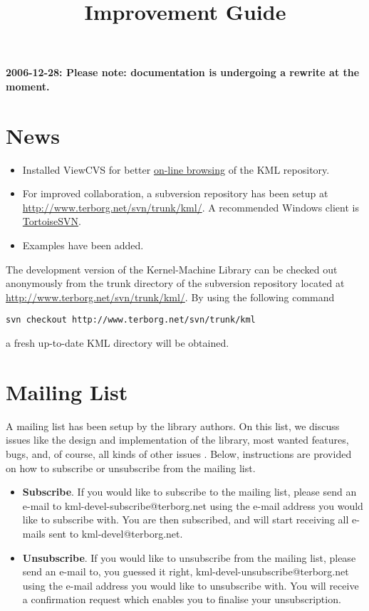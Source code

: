 \documentclass{article}
\begin{document}
\title{Improvement Guide}
\maketitle

\textbf{2006-12-28: Please note: documentation is undergoing a rewrite at the moment.}

\section*{News}

\begin{itemize}

\item Installed ViewCVS for better 
\href{http://www.terborg.net/cgi-bin/viewcvs.cgi/trunk/kml/}{on-line browsing}
of the KML repository.
\item For improved collaboration, a subversion repository has been 
setup at \href{http://www.terborg.net/svn/trunk/kml/}{http://www.terborg.net/svn/trunk/kml/}. A
recommended Windows client is \href{http://tortoisesvn.tigris.org/}{TortoiseSVN}.
\item Examples have been added.

\end{itemize}


The development version of the Kernel-Machine Library can be checked out anonymously from 
the trunk directory of the subversion repository located at 
\href{http://www.terborg.net/svn/trunk/kml/}{http://www.terborg.net/svn/trunk/kml/}. By using the following command
\begin{verbatim}
svn checkout http://www.terborg.net/svn/trunk/kml
\end{verbatim}
a fresh up-to-date KML directory will be obtained. 

\section*{Mailing List}
A mailing list has been setup by the library authors. 
On this list, we discuss issues like the design and implementation of the library, 
most wanted features, bugs,
and, of course, all kinds of other issues \smile.
Below, instructions are provided on how to subscribe or unsubscribe from the mailing list.

\begin{itemize}
\item \textbf{Subscribe}. If you would like to subscribe to the mailing list, please send an
e-mail to kml-devel-subscribe@terborg.net using the e-mail address you would like to subscribe
with. You are then subscribed, and will start receiving all e-mails sent to kml-devel@terborg.net.
\item \textbf{Unsubscribe}. If you would like to unsubscribe from the mailing list,
please send an e-mail to, you guessed it right, kml-devel-unsubscribe@terborg.net
using the e-mail address you would like to unsubscribe with. 
You will receive a confirmation request which enables you to finalise your unsubscription.
\end{itemize}
\end{document}
